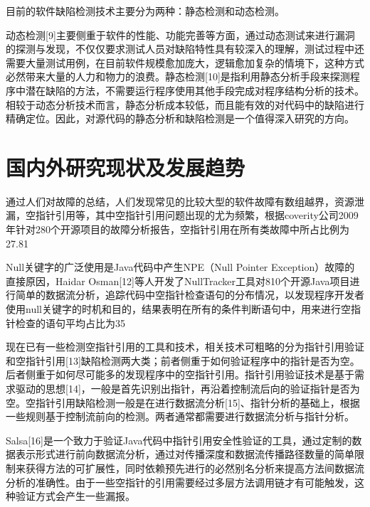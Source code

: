 目前的软件缺陷检测技术主要分为两种：静态检测和动态检测。 

动态检测[9]主要侧重于软件的性能、功能完善等方面，通过动态测试来进行漏洞的探测与发现，不仅仅要求测试人员对缺陷特性具有较深入的理解，测试过程中还需要大量测试用例，在目前软件规模愈加庞大，逻辑愈加复杂的情境下，这种方式必然带来大量的人力和物力的浪费。静态检测[10]是指利用静态分析手段来探测程序中潜在缺陷的方法，不需要运行程序使用其他手段完成对程序结构分析的技术。相较于动态分析技术而言，静态分析成本较低，而且能有效的对代码中的缺陷进行精确定位。因此，对源代码的静态分析和缺陷检测是一个值得深入研究的方向。

\section{国内外研究现状及发展趋势}
通过人们对故障的总结，人们发现常见的比较大型的软件故障有数组越界，资源泄漏，空指针引用等，其中空指针引用问题出现的尤为频繁，根据coverity公司2009年针对280个开源项目的故障分析报告，空指针引用在所有类故障中所占比例为27.81%

Null关键字的广泛使用是Java代码中产生NPE（Null Pointer Exception）故障的直接原因，Haidar Osman[12]等人开发了NullTracker工具对810个开源Java项目进行简单的数据流分析，追踪代码中空指针检查语句的分布情况，以发现程序开发者使用null关键字的时机和目的，结果表明在所有的条件判断语句中，用来进行空指针检查的语句平均占比为35%

现在已有一些检测空指针引用的工具和技术，相关技术可粗略的分为指针引用验证和空指针引用[13]缺陷检测两大类；前者侧重于如何验证程序中的指针是否为空。后者侧重于如何尽可能多的发现程序中的空指针引用。指针引用验证技术是基于需求驱动的思想[14]，一般是首先识别出指针，再沿着控制流后向的验证指针是否为空。空指针引用缺陷检测一般是在进行数据流分析[15]、指针分析的基础上，根据一些规则基于控制流前向的检测。两者通常都需要进行数据流分析与指针分析。

Salsa[16]是一个致力于验证Java代码中指针引用安全性验证的工具，通过定制的数据表示形式进行前向数据流分析，通过对传播深度和数据流传播路径数量的简单限制来获得方法的可扩展性，同时依赖预先进行的必然别名分析来提高方法间数据流分析的准确性。由于一些空指针的引用需要经过多层方法调用链才有可能触发，这种验证方式会产生一些漏报。

